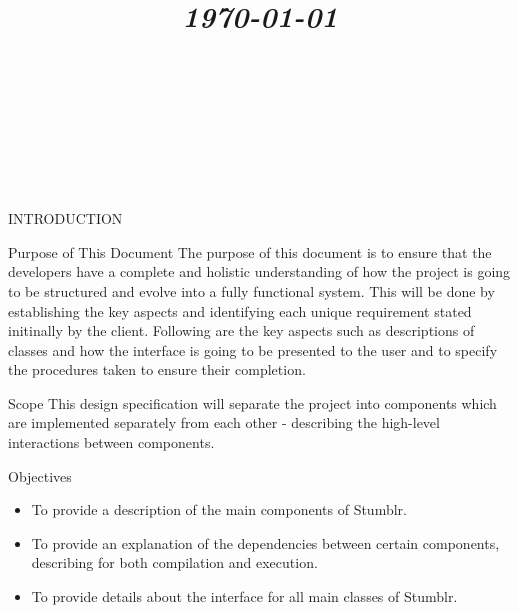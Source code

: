 \documentclass{article}
\title{
	\vspace{1.2in}
	\textmd{\textbf{\doctitle}} \\
	\vspace{0.1in}\large{\textit{\today}} \\
	\vspace{0.4in}
	{\bf{\qanumber}} \\ \vspace{0.4in}
	\version \\
	\status \\
	\vspace{0.4in}
}
\author{\authors}
\date{}
\begin{document}
	\maketitle
	\newpage
	\tableofcontents
	\newpage

	\begin{section}{INTRODUCTION}
		\begin{subsection}{Purpose of This Document}
			The purpose of this document is to ensure that the developers have a complete and holistic understanding of how the project is going to be structured and evolve into a fully functional system. This will be done by establishing the key aspects and identifying each unique requirement stated initinally by the client. Following are the key aspects such as descriptions of classes and how the interface is going to be presented to the user and to specify the procedures taken to ensure their completion.
		\end{subsection}
	
		\begin{subsection}{Scope}
			This design specification will separate the project into components which are implemented separately from each other - describing the high-level interactions between components. 
		\end{subsection}
		
		\begin{subsection}{Objectives}
			\begin{itemize}
				\item{To provide a description of the main components of Stumblr.}
				\item{To provide an explanation of the dependencies between certain components, describing for both compilation and execution.}
				\item{To provide details about the interface for all main classes of Stumblr.}
			\end{itemize}
		\end{subsection}
	\end{section}
	
	
	
\end{document}
